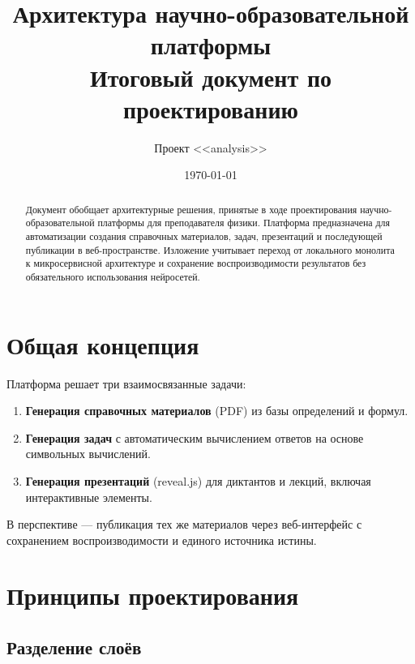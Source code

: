 \documentclass[12pt,a4paper]{article}
\title{\textbf{Архитектура научно-образовательной платформы}\\[0.5em]
\large Итоговый документ по проектированию}
\author{Проект <<analysis>>}
\date{\today}
\begin{document}
\maketitle

\begin{abstract}
\noindent
Документ обобщает архитектурные решения, принятые в ходе проектирования
научно-образовательной платформы для преподавателя физики. Платформа
предназначена для автоматизации создания справочных материалов, задач,
презентаций и последующей публикации в веб-пространстве. Изложение
учитывает переход от локального монолита к микросервисной архитектуре
и сохранение воспроизводимости результатов без обязательного
использования нейросетей.
\end{abstract}

\tableofcontents
\newpage

\section{Общая концепция}

Платформа решает три взаимосвязанные задачи:

\begin{enumerate}[label=\textbf{\arabic*.}]
    \item \textbf{Генерация справочных материалов} (PDF) из базы
          определений и формул.
    \item \textbf{Генерация задач} с автоматическим вычислением ответов
          на основе символьных вычислений.
    \item \textbf{Генерация презентаций} (reveal.js) для диктантов
          и лекций, включая интерактивные элементы.
\end{enumerate}

\noindent
В перспективе --- публикация тех же материалов через веб-интерфейс
с сохранением воспроизводимости и единого источника истины.

\section{Принципы проектирования}

\subsection{Разделение слоёв}
\end{document}

